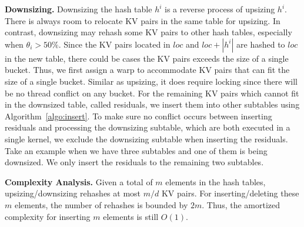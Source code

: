 \vspace{1mm}\noindent\textbf{Downsizing.}
Downsizing the hash table $h^i$ is a reverse process of upsizing $h^i$. There is always room to relocate KV pairs in the same table for upsizing. 
In contrast, downsizing may rehash some KV pairs to other hash tables, especially when $\theta_i > 50\%$.
Since the KV pairs located in $loc$ and $loc+|h^i|$ are hashed to $loc$ in the new table, there could be cases the KV pairs exceeds the size of a single bucket. 
Thus, we first assign a warp to accommodate KV pairs that can fit the size of a single bucket. Similar as upsizing, it does require locking since there will be no thread conflict on any bucket. 
For the remaining KV pairs which cannot fit in the downsized table, called residuals, we insert them into other subtables using Algorithm~\ref{algo:insert}.
To make sure no conflict occurs between inserting residuals and processing the downsizing subtable, which are both executed in a single kernel, we exclude the downsizing subtable when inserting the residuals. 
Take an example when we have three subtables and one of them is being downsized. 
We only insert the residuals to the remaining two subtables. 



\vspace{1mm}\noindent\textbf{Complexity Analysis.}
Given a total of $m$ elements in the hash tables, upsizing/downsizing rehashes at most $m/d$ KV pairs. 
For inserting/deleting these $m$ elements, the number of rehashes is bounded by $2m$. 
Thus, the amortized complexity for inserting $m$ elements is still $O(1)$.
